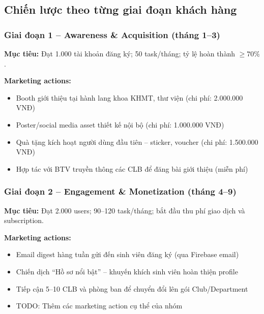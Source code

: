 
\subsection{Chiến lược theo từng giai đoạn khách hàng}

\subsubsection{Giai đoạn 1 -- Awareness \& Acquisition (tháng 1--3)}

\textbf{Mục tiêu:} Đạt 1.000 tài khoản đăng ký; 50 task/tháng; tỷ lệ hoàn thành $\geq 70\%$.

\textbf{Marketing actions:}
\begin{itemize}
  \item Booth giới thiệu tại hành lang khoa KHMT, thư viện (chi phí: 2.000.000 VNĐ)
  \item Poster/social media asset thiết kế nội bộ (chi phí: 1.000.000 VNĐ)
  \item Quà tặng kích hoạt người dùng đầu tiên -- sticker, voucher (chi phí: 1.500.000 VNĐ)
  \item Hợp tác với BTV truyền thông các CLB để đăng bài giới thiệu (miễn phí)
\end{itemize}

\subsubsection{Giai đoạn 2 -- Engagement \& Monetization (tháng 4--9)}

\textbf{Mục tiêu:} Đạt 2.000 users; 90--120 task/tháng; bắt đầu thu phí giao dịch và subscription.

\textbf{Marketing actions:}
\begin{itemize}
  \item Email digest hàng tuần gửi đến sinh viên đăng ký (qua Firebase email)
  \item Chiến dịch ``Hồ sơ nổi bật'' -- khuyến khích sinh viên hoàn thiện profile
  \item Tiếp cận 5--10 CLB và phòng ban để chuyển đổi lên gói Club/Department
  \item TODO: Thêm các marketing action cụ thể của nhóm
\end{itemize}

